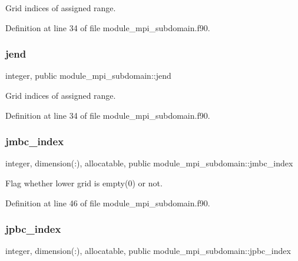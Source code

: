 Grid indices of assigned range. 



Definition at line 34 of file module\+\_\+mpi\+\_\+subdomain.\+f90.

\mbox{\label{namespacemodule__mpi__subdomain_a5c6fcfcea80e9294d32411c15091955c}} 
\subsubsection{\texorpdfstring{jend}{jend}}
{\footnotesize\ttfamily integer, public module\+\_\+mpi\+\_\+subdomain\+::jend}



Grid indices of assigned range. 



Definition at line 34 of file module\+\_\+mpi\+\_\+subdomain.\+f90.

\mbox{\label{namespacemodule__mpi__subdomain_a1c2c2f77c74c40af73c7f65e3cba756e}} 
\subsubsection{\texorpdfstring{jmbc\_index}{jmbc\_index}}
{\footnotesize\ttfamily integer, dimension(\+:), allocatable, public module\+\_\+mpi\+\_\+subdomain\+::jmbc\+\_\+index}



Flag whether lower grid is empty(0) or not. 



Definition at line 46 of file module\+\_\+mpi\+\_\+subdomain.\+f90.

\mbox{\label{namespacemodule__mpi__subdomain_a9cf8549a75cc5cc0cd1541b2567c7dfd}} 
\subsubsection{\texorpdfstring{jpbc\_index}{jpbc\_index}}
{\footnotesize\ttfamily integer, dimension(\+:), allocatable, public module\+\_\+mpi\+\_\+subdomain\+::jpbc\+\_\+index}



